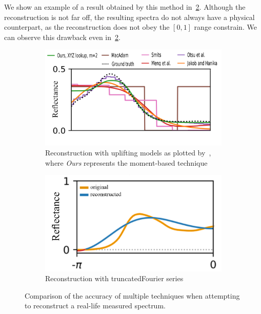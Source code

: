 We show an example of a result obtained by this method in~\cref{fig:specRecTruncatedFourier}. Although the reconstruction is not far off, the resulting spectra do not always have a physical counterpart, as the reconstruction does not obey the $[0,1]$ range constrain. We can observe this drawback even in~\cref{fig:specRecTruncatedFourier}.

\begin{figure}[t]
	\centering
	\begin{subfigure}[t]{0.45\textwidth}
	\includegraphics[width=\linewidth]{img/spectra_rec_method_comparison.png}
	\caption{Reconstruction with uplifting models as plotted by~\citet{trigonometricMomentsPaper}, where \emph{Ours} represents the moment-based technique}
	\label{fig:specRecUpliftingMethods}
	\end{subfigure} \hspace{0.1em}
	\begin{subfigure}[t]{0.45\textwidth}
	\includegraphics[width=\linewidth]{img/spectra_rec_truncated_fourier.png}
	\caption{Reconstruction with truncated\newline Fourier series~\cite{trigonometricMomentsPresentation}}
	\label{fig:specRecTruncatedFourier}
	\end{subfigure}
	\caption{Comparison of the accuracy of multiple techniques when attempting to reconstruct a real-life measured spectrum.}
	\label{fig:spectraReconstruction}
\end{figure}

